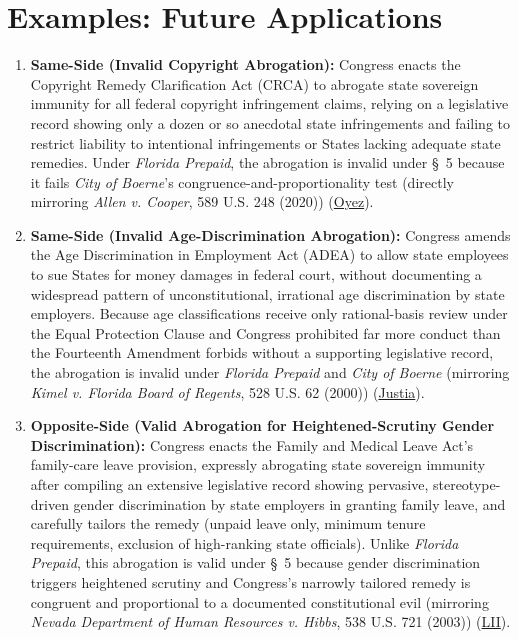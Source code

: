 \documentclass[12pt]{article}
\begin{document}
\section{Examples: Future Applications}

\begin{enumerate}
\item \textbf{Same-Side (Invalid Copyright Abrogation):} Congress enacts the Copyright Remedy Clarification Act (CRCA) to abrogate state sovereign immunity for all federal copyright infringement claims, relying on a legislative record showing only a dozen or so anecdotal state infringements and failing to restrict liability to intentional infringements or States lacking adequate state remedies. Under \textit{Florida Prepaid}, the abrogation is invalid under \S~5 because it fails \textit{City of Boerne}'s congruence-and-proportionality test (directly mirroring \textit{Allen v. Cooper}, 589 U.S. 248 (2020)) (\href{https://www.oyez.org/cases/2019/18-877}{Oyez}).

\item \textbf{Same-Side (Invalid Age-Discrimination Abrogation):} Congress amends the Age Discrimination in Employment Act (ADEA) to allow state employees to sue States for money damages in federal court, without documenting a widespread pattern of unconstitutional, irrational age discrimination by state employers. Because age classifications receive only rational-basis review under the Equal Protection Clause and Congress prohibited far more conduct than the Fourteenth Amendment forbids without a supporting legislative record, the abrogation is invalid under \textit{Florida Prepaid} and \textit{City of Boerne} (mirroring \textit{Kimel v. Florida Board of Regents}, 528 U.S. 62 (2000)) (\href{https://supreme.justia.com/cases/federal/us/528/62/}{Justia}).

\item \textbf{Opposite-Side (Valid Abrogation for Heightened-Scrutiny Gender Discrimination):} Congress enacts the Family and Medical Leave Act's family-care leave provision, expressly abrogating state sovereign immunity after compiling an extensive legislative record showing pervasive, stereotype-driven gender discrimination by state employers in granting family leave, and carefully tailors the remedy (unpaid leave only, minimum tenure requirements, exclusion of high-ranking state officials). Unlike \textit{Florida Prepaid}, this abrogation is valid under \S~5 because gender discrimination triggers heightened scrutiny and Congress's narrowly tailored remedy is congruent and proportional to a documented constitutional evil (mirroring \textit{Nevada Department of Human Resources v. Hibbs}, 538 U.S. 721 (2003)) (\href{https://www.law.cornell.edu/supct/html/01-1368.ZS.html}{LII}).


\end{enumerate}
\end{document}
